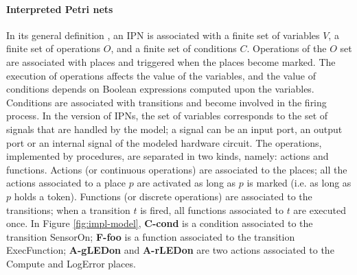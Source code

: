 \paragraph{Interpreted Petri nets}
In its general definition \cite{David1994}, an IPN is associated with
a finite set of variables $V$, a finite set of operations $O$, and a
finite set of conditions $C$. Operations of the $O$ set are associated
with places and triggered when the places become marked. The execution
of operations affects the value of the variables, and the value of
conditions depends on Boolean expressions computed upon the variables.
Conditions are associated with transitions and become involved in the
firing process.  In the \hilecop{} version of
IPNs, %
the set of variables corresponds to the set of \vhdl{} signals that
are handled by the model; a signal can be an input port, an output
port or an internal signal of the modeled hardware circuit. The
operations, implemented by \vhdl{} procedures, are separated in two
kinds, namely: actions and functions. Actions (or continuous
operations) are associated to the places; all the actions associated
to a place $p$ are activated as long as $p$ is marked (i.e. as long as
$p$ holds a token). Functions (or discrete operations) are associated
to the transitions; when a transition $t$ is fired, all functions
associated to $t$ are executed once. In Figure \ref{fig:impl-model},
\textbf{C-cond} is a condition associated to the transition SensorOn;
\textbf{F-foo} is a function associated to the transition
ExecFunction; \textbf{A-gLEDon} and \textbf{A-rLEDon} are two actions
associated to the Compute and LogError places.

